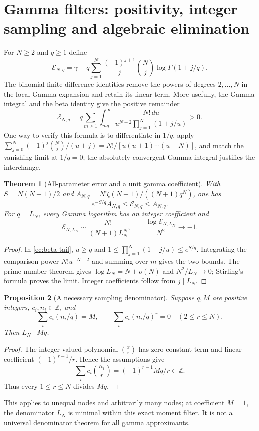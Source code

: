 \documentclass[11pt,a4paper]{article}
\newcommand{\Z}{\mathbb Z}
\newtheorem{theorem}{Theorem}[section]
\newtheorem{proposition}[theorem]{Proposition}
\theoremstyle{definition}
\theoremstyle{remark}
\numberwithin{equation}{section}
\begin{document}
\section{Gamma filters: positivity, integer sampling and algebraic elimination}
\label{ec:filters}

For $N\ge2$ and $q\ge1$ define
\[
 \mathcal E_{N,q}=\gamma+
 q\sum_{j=1}^N\frac{(-1)^{j+1}}j\binom Nj
       \log\Gamma(1+j/q).
\]
The binomial finite-difference identities remove the powers of degrees
$2,\ldots,N$ in the local Gamma expansion and retain its linear term.
More usefully, the Gamma integral and the beta identity give the positive
remainder
\begin{equation}\label{ec:beta-tail}
 \mathcal E_{N,q}
 =q\sum_{m\ge1}\int_{mq}^\infty
       \frac{N!\,du}{u^{N+2}\prod_{j=1}^N(1+j/u)}>0.
\end{equation}
One way to verify this formula is to differentiate in $1/q$, apply
$\sum_{j=0}^N(-1)^j\binom Nj/(u+j)=N!/[u(u+1)\cdots(u+N)]$,
and match the vanishing limit at $1/q=0$; the absolutely convergent
Gamma integral justifies the interchange.

\begin{theorem}[All-parameter error and a unit gamma coefficient]
\label{ec:filter-error}
With $S=N(N+1)/2$ and
$A_{N,q}=N!\zeta(N+1)/((N+1)q^N)$, one has
\[
 e^{-S/q}A_{N,q}\le\mathcal E_{N,q}\le A_{N,q}.
\]
For $q=L_N$, every Gamma logarithm has an integer coefficient and
\[
 \mathcal E_{N,L_N}\sim\frac{N!}{(N+1)L_N^N},\qquad
 \frac{\log\mathcal E_{N,L_N}}{N^2}\longrightarrow-1.
\]
\end{theorem}
\begin{proof}
In \eqref{ec:beta-tail}, $u\ge q$ and
$1\le\prod_{j=1}^N(1+j/u)\le e^{S/q}$.  Integrating the comparison
power $N!u^{-N-2}$ and summing over $m$ gives the two bounds.
The prime number theorem gives $\log L_N=N+o(N)$ and
$N^2/L_N\to0$; Stirling's formula proves the limit.  Integer coefficients
follow from $j\mid L_N$.
\end{proof}

\begin{proposition}[A necessary sampling denominator]
\label{ec:lcm-necessity}
Suppose $q,M$ are positive integers, $c_i,n_i\in\Z$, and
\[
 \sum_i c_i(n_i/q)=M,\qquad
 \sum_i c_i(n_i/q)^r=0\quad(2\le r\le N).
\]
Then $L_N\mid Mq$.
\end{proposition}
\begin{proof}
The integer-valued polynomial $\binom{x}{r}$ has zero constant term
and linear coefficient $(-1)^{r-1}/r$.  Hence the assumptions give
\[
 \sum_i c_i\binom{n_i}{r}=(-1)^{r-1}Mq/r\in\Z.
\]
Thus every $1\le r\le N$ divides $Mq$.
\end{proof}
This applies to unequal nodes and arbitrarily many nodes; at coefficient
$M=1$, the denominator $L_N$ is minimal within this exact moment filter.
It is not a universal denominator theorem for all gamma approximants.
\end{document}
